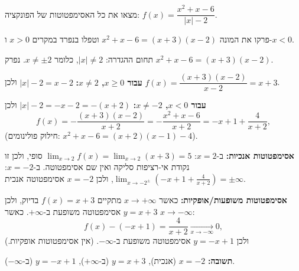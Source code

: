 
\begin{question}
מצאו את כל האסימפטוטות של הפונקציה: $f(x)=\dfrac{x^2+x-6}{|x|-2}$.
\end{question}

\begin{hint}
פרקו את המונה $x^2+x-6=(x+3)(x-2)$ וטפלו בנפרד במקרים $x>0$ ו-$x<0$.
\end{hint}

\begin{solution}
תחום ההגדרה: $|x|\neq2$, כלומר $x\neq\pm2$. נפרק $x^2+x-6=(x+3)(x-2)$.

\textbf{עבור $x\ge0$, $x\ne 2$:} $|x|-2=x-2$ ולכן $f(x)=\dfrac{(x+3)(x-2)}{x-2}=x+3$.

\textbf{עבור $x<0$, $x\ne-2$:} $|x|-2=-x-2=-(x+2)$ ולכן
\[ f(x)=-\frac{(x+3)(x-2)}{x+2}=-\frac{x^2+x-6}{x+2}=-x+1+\frac{4}{x+2}, \]
(חילוק פולינומים: $x^2+x-6=(x+2)(x-1)-4$).

\textbf{אסימפטוטות אנכיות:} ב-$x=2$: $\lim_{x\to2}f(x)=\lim_{x\to2}(x+3)=5$ סופי, ולכן זו נקודת אי-רציפות סליקה ואין שם אסימפטוטה. ב-$x=-2$: $\lim_{x\to-2^\pm}\left(-x+1+\frac{4}{x+2}\right)=\pm\infty$, ולכן $x=-2$ אסימפטוטה אנכית.

\textbf{אסימפטוטות משופעות/אופקיות:} כאשר $x\to+\infty$ מתקיים $f(x)=x+3$ בדיוק, ולכן $y=x+3$ אסימפטוטה משופעת ב-$+\infty$. כאשר $x\to-\infty$:
\[ f(x)-(-x+1)=\frac{4}{x+2}\xrightarrow[x\to-\infty]{}0, \]
ולכן $y=-x+1$ אסימפטוטה משופעת ב-$-\infty$. (אין אסימפטוטות אופקיות.)

\textbf{תשובה:} $x=-2$ (אנכית), $y=x+3$ (ב-$+\infty$), $y=-x+1$ (ב-$-\infty$).
\end{solution}
